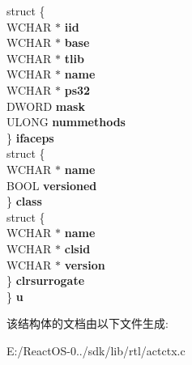 \begin{DoxyCompactItemize}
\begin{tabbing}
\>struct \{\\
\>\>WCHAR $\ast$ {\bfseries iid}\\
\>\>WCHAR $\ast$ {\bfseries base}\\
\>\>WCHAR $\ast$ {\bfseries tlib}\\
\>\>WCHAR $\ast$ {\bfseries name}\\
\>\>WCHAR $\ast$ {\bfseries ps32}\\
\>\>DWORD {\bfseries mask}\\
\>\>ULONG {\bfseries nummethods}\\
\>\} {\bfseries ifaceps}\\
\>struct \{\\
\>\>WCHAR $\ast$ {\bfseries name}\\
\>\>BOOL {\bfseries versioned}\\
\>\} {\bfseries class}\\
\>struct \{\\
\>\>WCHAR $\ast$ {\bfseries name}\\
\>\>WCHAR $\ast$ {\bfseries clsid}\\
\>\>WCHAR $\ast$ {\bfseries version}\\
\>\} {\bfseries clrsurrogate}\\
\} {\bfseries u}\\

\end{tabbing}\end{DoxyCompactItemize}


该结构体的文档由以下文件生成\+:\begin{DoxyCompactItemize}
\item 
E\+:/\+React\+O\+S-\/0../sdk/lib/rtl/actctx.\+c\end{DoxyCompactItemize}
